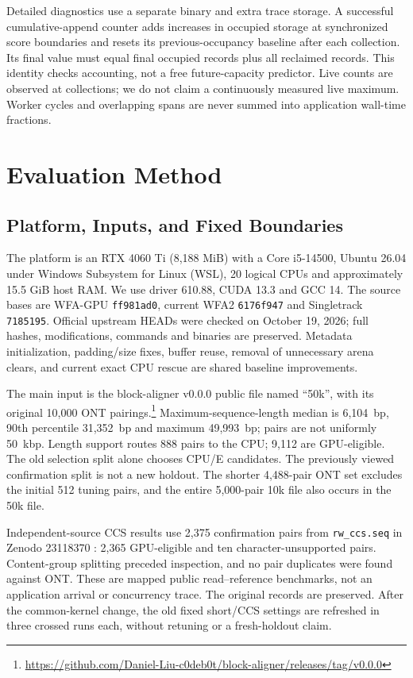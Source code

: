 \documentclass[conference,a4paper]{IEEEtran}
\begin{document}
Detailed diagnostics use a separate binary and extra trace storage. A successful cumulative-append counter adds increases in occupied storage at synchronized score boundaries and resets its previous-occupancy baseline after each collection. Its final value must equal final occupied records plus all reclaimed records. This identity checks accounting, not a free future-capacity predictor. Live counts are observed at collections; we do not claim a continuously measured live maximum. Worker cycles and overlapping spans are never summed into application wall-time fractions.

\section{Evaluation Method}
\subsection{Platform, Inputs, and Fixed Boundaries}
The platform is an RTX 4060 Ti (8,188 MiB) with a Core i5-14500, Ubuntu 26.04 under Windows Subsystem for Linux (WSL), 20 logical CPUs and approximately 15.5 GiB host RAM. We use driver 610.88, CUDA 13.3 and GCC 14. The source bases are WFA-GPU \texttt{ff981ad0}, current WFA2 \texttt{6176f947} and Singletrack \texttt{7185195}. Official upstream HEADs were checked on October 19, 2026; full hashes, modifications, commands and binaries are preserved. Metadata initialization, padding/size fixes, buffer reuse, removal of unnecessary arena clears, and current exact CPU rescue are shared baseline improvements.

The main input is the block-aligner v0.0.0 public file named ``50k'', with its original 10,000 ONT pairings.\footnote{\url{https://github.com/Daniel-Liu-c0deb0t/block-aligner/releases/tag/v0.0.0}} Maximum-sequence-length median is 6,104~bp, 90th percentile 31,352~bp and maximum 49,993~bp; pairs are not uniformly 50~kbp. Length support routes 888 pairs to the CPU; 9,112 are GPU-eligible. The old selection split alone chooses CPU/E candidates. The previously viewed confirmation split is not a new holdout. The shorter 4,488-pair ONT set excludes the initial 512 tuning pairs, and the entire 5,000-pair 10k file also occurs in the 50k file.

Independent-source CCS results use 2,375 confirmation pairs from \texttt{rw\_ccs.seq} in Zenodo 23118370 \cite{wfaCharacterization2026}: 2,365 GPU-eligible and ten character-unsupported pairs. Content-group splitting preceded inspection, and no pair duplicates were found against ONT. These are mapped public read--reference benchmarks, not an application arrival or concurrency trace. The original records are preserved. After the common-kernel change, the old fixed short/CCS settings are refreshed in three crossed runs each, without retuning or a fresh-holdout claim.
\end{document}
